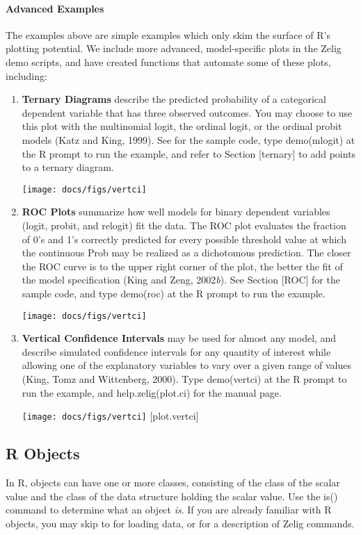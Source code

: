 \documentclass[letterpaper,10pt,english]{sphinxmanual}
\begin{document}
\paragraph{Advanced Examples}
\label{docs/user_guide:advanced-examples}
The examples above are simple examples which only skim the surface of
R’s plotting potential. We include more advanced, model-specific plots
in the Zelig demo scripts, and have created functions that automate some
of these plots, including:
\begin{enumerate}
\item {} 
\textbf{Ternary Diagrams} describe the predicted probability of a
categorical dependent variable that has three observed outcomes. You
may choose to use this plot with the multinomial logit, the ordinal
logit, or the ordinal probit models (Katz and King, 1999). See for
the sample code, type demo(mlogit) at the R prompt to run the
example, and refer to Section {[}ternary{]} to add points to a ternary
diagram.

\texttt{[image: docs/figs/vertci]}

\item {} 
\textbf{ROC Plots} summarize how well models for binary dependent
variables (logit, probit, and relogit) fit the data. The ROC plot
evaluates the fraction of 0’s and 1’s correctly predicted for every
possible threshold value at which the continuous
Prob may be realized as a dichotomous prediction.
The closer the ROC curve is to the upper right corner of the plot,
the better the fit of the model specification (King and Zeng,
2002\emph{b}). See Section {[}ROC{]} for the sample code, and type demo(roc)
at the R prompt to run the example.

\texttt{[image: docs/figs/vertci]}

\item {} 
\textbf{Vertical Confidence Intervals} may be used for almost any model,
and describe simulated confidence intervals for any quantity of
interest while allowing one of the explanatory variables to vary over
a given range of values (King, Tomz and Wittenberg, 2000). Type
demo(vertci) at the R prompt to run the example, and
help.zelig(plot.ci) for the manual page.

\texttt{[image: docs/figs/vertci]} {[}plot.vertci{]}

\end{enumerate}


\subsection{R Objects}
\label{docs/user_guide:userguide-r-objects}\label{docs/user_guide:r-objects}
In R, objects can have one or more classes, consisting of the class of
the scalar value and the class of the data structure holding the scalar
value. Use the is() command to determine what an object \emph{is}. If you are
already familiar with R objects, you may skip to for loading data, or
for a description of Zelig commands.
\end{document}
